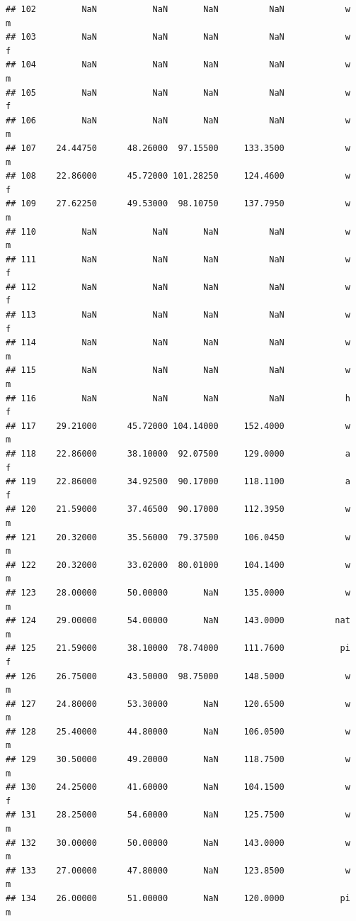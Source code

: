 \documentclass[]{article}
\begin{document}
\begin{verbatim}
## 102         NaN           NaN       NaN          NaN            w         m
## 103         NaN           NaN       NaN          NaN            w         f
## 104         NaN           NaN       NaN          NaN            w         m
## 105         NaN           NaN       NaN          NaN            w         f
## 106         NaN           NaN       NaN          NaN            w         m
## 107    24.44750      48.26000  97.15500     133.3500            w         m
## 108    22.86000      45.72000 101.28250     124.4600            w         f
## 109    27.62250      49.53000  98.10750     137.7950            w         m
## 110         NaN           NaN       NaN          NaN            w         m
## 111         NaN           NaN       NaN          NaN            w         f
## 112         NaN           NaN       NaN          NaN            w         f
## 113         NaN           NaN       NaN          NaN            w         f
## 114         NaN           NaN       NaN          NaN            w         m
## 115         NaN           NaN       NaN          NaN            w         m
## 116         NaN           NaN       NaN          NaN            h         f
## 117    29.21000      45.72000 104.14000     152.4000            w         m
## 118    22.86000      38.10000  92.07500     129.0000            a         f
## 119    22.86000      34.92500  90.17000     118.1100            a         f
## 120    21.59000      37.46500  90.17000     112.3950            w         m
## 121    20.32000      35.56000  79.37500     106.0450            w         m
## 122    20.32000      33.02000  80.01000     104.1400            w         m
## 123    28.00000      50.00000       NaN     135.0000            w         m
## 124    29.00000      54.00000       NaN     143.0000          nat         m
## 125    21.59000      38.10000  78.74000     111.7600           pi         f
## 126    26.75000      43.50000  98.75000     148.5000            w         m
## 127    24.80000      53.30000       NaN     120.6500            w         m
## 128    25.40000      44.80000       NaN     106.0500            w         m
## 129    30.50000      49.20000       NaN     118.7500            w         m
## 130    24.25000      41.60000       NaN     104.1500            w         f
## 131    28.25000      54.60000       NaN     125.7500            w         m
## 132    30.00000      50.00000       NaN     143.0000            w         m
## 133    27.00000      47.80000       NaN     123.8500            w         m
## 134    26.00000      51.00000       NaN     120.0000           pi         m

\end{verbatim}
\end{document}
